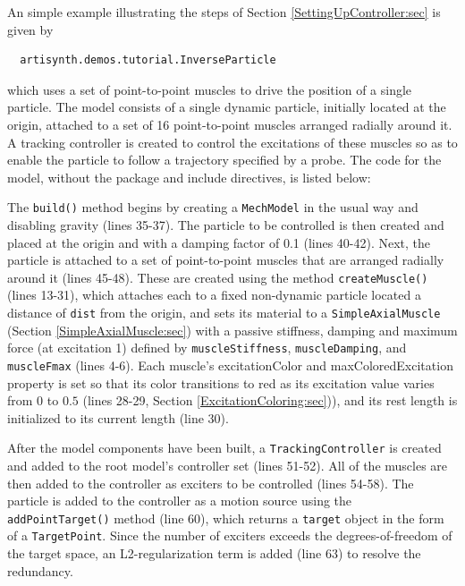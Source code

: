 An simple example illustrating the steps of
Section \ref{SettingUpController:sec} is given by
%
\begin{verbatim}
  artisynth.demos.tutorial.InverseParticle
\end{verbatim}
%
which uses a set of point-to-point muscles to drive the position of a single
particle. The model consists of a single dynamic particle, initially located at
the origin, attached to a set of 16 point-to-point muscles arranged radially
around it. A tracking controller is created to control the excitations of these
muscles so as to enable the particle to follow a trajectory specified by a
probe. The code for the model, without the package and include directives, is
listed below:
%
\lstset{numbers=left}
\iflatexml

\else

\fi
\lstset{numbers=none}
%

The {\tt build()} method begins by creating a {\tt MechModel} in the usual way
and disabling gravity (lines 35-37). The particle to be controlled is then
created and placed at the origin and with a damping factor of 0.1 (lines
40-42). Next, the particle is attached to a set of point-to-point muscles that
are arranged radially around it (lines 45-48). These are created using the
method {\tt createMuscle()} (lines 13-31), which attaches each to a fixed
non-dynamic particle located a distance of {\tt dist} from the origin, and sets
its material to a {\tt SimpleAxialMuscle} (Section \ref{SimpleAxialMuscle:sec})
with a passive stiffness, damping and maximum force (at excitation 1) defined
by {\tt muscleStiffness}, {\tt muscleDamping}, and {\tt muscleFmax} (lines
4-6). Each muscle's {\sf excitationColor} and {\sf maxColoredExcitation}
property is set so that its color transitions to red as its excitation value
varies from $0$ to $0.5$ (lines 28-29, Section \ref{ExcitationColoring:sec})),
and its rest length is initialized to its current length (line 30).

After the model components have been built, a {\tt TrackingController} is
created and added to the root model's controller set (lines 51-52).  All of the
muscles are then added to the controller as exciters to be controlled (lines
54-58). The particle is added to the controller as a motion source using the
{\tt addPointTarget()} method (line 60), which returns a {\tt target} object
in the form of a {\tt TargetPoint}. Since the number of exciters exceeds the
degrees-of-freedom of the target space, an L2-regularization term is added
(line 63) to resolve the redundancy.

